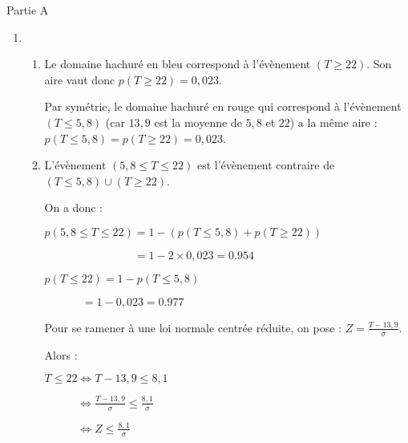 \begin{corrige}
     \begin{h3}Partie A\end{h3}
     \begin{enumerate}
          \item
          \begin{enumerate}[label=\alph*.]
               \item
\begin{center}
\end{center}
               Le domaine hachuré en bleu correspond à l'évènement $(T \geqslant 22)$. Son aire vaut donc $p(T \geqslant 22)=0,023$.
               \par
               Par symétrie, le domaine hachuré en rouge qui correspond à l'évènement $(T \leqslant 5,8)$ (car $13,9$ est la moyenne de $5,8$ et $22$) a la même aire : $p(T \leqslant 5,8) = p(T \geqslant 22)=0,023$.
               \item
               L'évènement $(5,8 \leqslant T \leqslant 22)$ est l'évènement contraire de $(T \leqslant 5,8) \cup(T \geqslant 22)$.
               \par
               On a donc :
               \par
               $p(5,8 \leqslant T \leqslant 22)= 1-(p(T \leqslant 5,8) + p(T \geqslant 22))$
               \par
               $\phantom{p(5,8 \leqslant T \leqslant 22)}= 1-2 \times 0,023=0.954$
               \par
               $p(T \leqslant 22)= 1-p(T \leqslant 5,8)$
               \par
               $\phantom{T \leqslant 22)} = 1- 0,023=0.977$
               \par
               Pour se ramener à une loi normale centrée réduite, on pose : $Z=\frac{T-13,9}{\sigma}$.
               \par
               Alors :
               \par
               $T \leqslant 22 \Leftrightarrow T-13,9\leqslant 8,1 $
               \par
               $\phantom{T \leqslant 22} \Leftrightarrow \frac{T-13,9}{\sigma}\leqslant \frac{8,1}{\sigma}  $
               \par
               $\phantom{T \leqslant 22} \Leftrightarrow Z\leqslant \frac{8,1}{\sigma}  $
               \par

\end{enumerate}
\end{enumerate}
\end{corrige}
